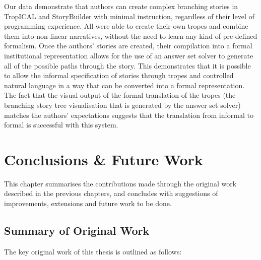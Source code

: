 \documentclass[11pt]{report}
\begin{document}
Our data demonstrate that authors can create complex branching stories in
TropICAL and StoryBuilder with minimal instruction, regardless of their level of
programming experience. All were able to create their own tropes and combine
them into non-linear narratives, without the need to learn any kind of
pre-defined formalism. Once the authors' stories are created, their compilation
into a formal institutional representation allows for the use of an answer set
solver to generate all of the possible paths through the story. This
demonstrates that it is possible to allow the informal specification of stories
through tropes and controlled natural language in a way that can be converted
into a formal representation. The fact that the visual output of the formal translation
of the tropes (the branching story tree visualisation that is generated by the
answer set solver) matches the authors' expectations suggests that the
translation from informal to formal is successful with this system.

\chapter{Conclusions \& Future Work}
\label{cha:conclusions}

This chapter summarises the contributions made through the original work described
in the previous chapters, and concludes with suggestions of improvements,
extensions and future work to be done.

\section{Summary of Original Work}

The key original work of this thesis is outlined as follows:
\end{document}

